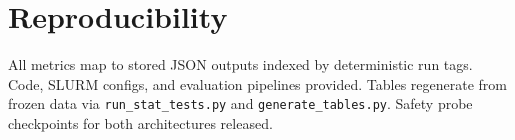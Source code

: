 \section*{Reproducibility}

All metrics map to stored JSON outputs indexed by deterministic run tags. Code, SLURM configs, and evaluation pipelines provided. Tables regenerate from frozen data via \texttt{run\_stat\_tests.py} and \texttt{generate\_tables.py}. Safety probe checkpoints for both architectures released.
